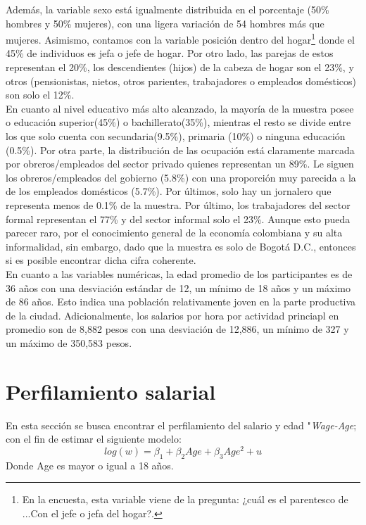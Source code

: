 Además, la variable sexo está igualmente distribuida en el porcentaje (50\% hombres y 50\% mujeres), con una ligera variación de 54 hombres más que mujeres. Asimismo, contamos con la variable posición dentro del hogar\footnote{En la encuesta, esta variable viene de la pregunta: ¿cuál es el parentesco de ...Con el jefe o jefa del hogar?.} donde el 45\% de individuos es jefa o jefe de hogar. Por otro lado, las parejas de estos representan el 20\%, los descendientes (hijos) de la cabeza de hogar son el 23\%, y otros (pensionistas, nietos, otros parientes, trabajadores o empleados domésticos) son solo el 12\%. \\ 

En cuanto al nivel educativo más alto alcanzado, la mayoría de la muestra posee o educación superior(45\%) o bachillerato(35\%), mientras el resto se divide entre los que solo cuenta con secundaria(9.5\%), primaria (10\%) o ninguna educación (0.5\%). Por otra parte, la distribución de las ocupación está claramente marcada por obreros/empleados del sector privado quienes representan un 89\%. Le siguen los obreros/empleados del gobierno (5.8\%) con una proporción muy parecida a la de los empleados domésticos (5.7\%). Por últimos, solo hay un jornalero que representa menos de 0.1\% de la muestra. Por último, los trabajadores del sector formal representan el 77\% y del sector informal solo el 23\%. Aunque esto pueda parecer raro, por el conocimiento general de la economía colombiana y su alta informalidad, sin embargo, dado que la muestra es solo de Bogotá D.C., entonces si es posible encontrar dicha cifra coherente.  \\

En cuanto a las variables numéricas, la edad promedio de los participantes es de 36 años con una desviación estándar de 12, un mínimo de 18 años y un máximo de 86 años. Esto indica una población relativamente joven en la parte productiva de la ciudad. Adicionalmente, los salarios por hora por actividad princiapl en promedio son de 8,882 pesos con una desviación de 12,886, un mínimo de 327 y un máximo de 350,583 pesos. 



\section{Perfilamiento salarial} \label{Sec:perfilamiento}
En esta sección se busca encontrar el perfilamiento del salario y edad "\textit{Wage-Age}; con el fin de estimar el siguiente modelo:
\begin{equation}
    log(w) = \beta_1 + \beta_2 Age +\beta_3 Age^2 + u
\end{equation}
Donde Age es mayor o igual a 18 años.\\ 

